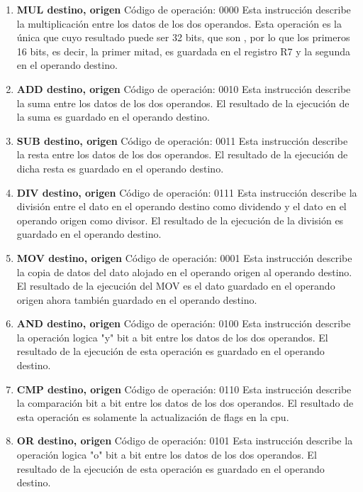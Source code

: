 \begin{enumerate}
\item \textbf{MUL destino, origen}
Código de operación: 0000
Esta instrucción describe la multiplicación entre los datos de los dos operandos. Esta operación es la única que cuyo resultado puede ser 32 bits, que son , por lo que los primeros 16 bits, es decir, la primer mitad, es guardada en el registro R7 y la segunda en el operando destino.
 
\item \textbf{ADD destino, origen}
Código de operación: 0010
Esta instrucción describe la suma entre los datos de los dos operandos. El resultado de la ejecución de la suma es guardado en el operando destino.

\item \textbf{SUB destino, origen}
Código de operación: 0011
Esta instrucción describe la resta entre los datos de los dos operandos. El resultado de la ejecución de dicha resta es guardado en el operando destino.

\item \textbf{DIV destino, origen}
Código de operación: 0111
Esta instrucción describe la división entre el dato en el operando destino como dividendo y el dato en el operando origen como divisor. El resultado de la ejecución de la división es guardado en el operando destino.

\item \textbf{MOV destino, origen}
Código de operación: 0001
Esta instrucción describe la copia de datos del dato alojado en el operando origen al operando destino. El resultado de la ejecución del MOV es el dato guardado en el operando origen ahora también guardado en el operando destino.

\item \textbf{AND destino, origen}
Código de operación: 0100
Esta instrucción describe la operación logica "y" bit a bit entre los datos de los dos operandos. El resultado de la ejecución de esta operación es guardado en el operando destino.

\item \textbf{CMP destino, origen}
Código de operación: 0110
Esta instrucción describe la comparación bit a bit entre los datos de los dos operandos. El resultado de esta operación es solamente la actualización de flags en la cpu.

\item \textbf{OR destino, origen}
Código de operación: 0101
Esta instrucción describe la operación logica "o" bit a bit entre los datos de los dos operandos. El resultado de la ejecución de esta operación es guardado en el operando destino.
\end{enumerate}


